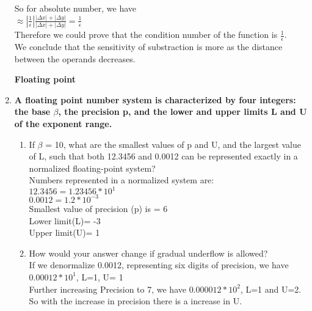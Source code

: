 \documentclass[12pt, oneside]{article}   	%
\begin{document}
\begin{enumerate}
       So for absolute number, we have\\
       
         \hspace{3cm}	$\approx |\frac{1}{\epsilon}|\frac{ |\Delta x | +| \Delta y| } { |\Delta x| + | \Delta y|} = \frac{1}{\epsilon}$\\
         
         Therefore we could prove that the condition number of the function is $\frac{1}{\epsilon}$.\\
         We conclude that the sensitivity of substraction is more as the distance between the operands decreases.\\
         
         \hspace{4cm}
         
         
    	
    	
\textbf{ \Large Floating point}\\	
		\item \textbf{A floating point number system is characterized by four integers: the base $\beta$, the precision p, and the lower and upper limits L and U of the exponent range.}
		\begin{enumerate}
		\item  If $\beta$ = 10, what are the smallest values of p and U, and the largest value of L, such that both 12.3456 and 0.0012 can be represented exactly in a normalized floating-point system?\\
		 
		 Numbers represented in a normalized system are:\\
		 $12.3456= 1.23456 * 10^1$\\
		 $0.0012= 1.2 * 10^{-3}$\\
		 
		 Smallest value of precision (p) is = 6\\
		 Lower limit(L)= -3\\
		 Upper limit(U)= 1\\
		 
		   \hspace{3cm}
		\item How would your answer change if gradual underflow is allowed?\\
		
		If we denormalize 0.0012, representing six digits of precision, we have $0.00012 *10^1$, L=1, U= 1\\
		Further increasing Precision to 7, we have $0.000012*10^2$, L=1 and U=2.  
		So with the increase in precision there is a increase in U.
	\end{enumerate}


\end{enumerate}
\end{document}
